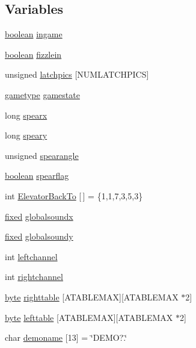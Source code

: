 \subsection*{Variables}
\begin{DoxyCompactItemize}
\item 
\hyperlink{ID__HEAD_8H_a7c6368b321bd9acd0149b030bb8275ed}{boolean} \hyperlink{WL__GAME_8C_aa5cd2906ddbef01eb4893f711504c438}{ingame}
\item 
\hyperlink{ID__HEAD_8H_a7c6368b321bd9acd0149b030bb8275ed}{boolean} \hyperlink{WL__GAME_8C_acfcefdf2f47adc93363a7557a347accd}{fizzlein}
\item 
unsigned \hyperlink{WL__GAME_8C_adbe64e9f4cdaee2e69ce2b915bd5c9ff}{latchpics} \mbox{[}NUMLATCHPICS\mbox{]}
\item 
\hyperlink{structgametype}{gametype} \hyperlink{WL__GAME_8C_a3aae581094bd3233febed90eb582c70d}{gamestate}
\item 
long \hyperlink{WL__GAME_8C_a1ef14592c8e9de332d645be5e3374f4a}{spearx}
\item 
long \hyperlink{WL__GAME_8C_a01339fc6073a44a9034c4be0521b04f8}{speary}
\item 
unsigned \hyperlink{WL__GAME_8C_aeabd6653f233001b4ab39e050f68e50a}{spearangle}
\item 
\hyperlink{ID__HEAD_8H_a7c6368b321bd9acd0149b030bb8275ed}{boolean} \hyperlink{WL__GAME_8C_acb0002722dd184f6c0ed9e21d9d4f4f2}{spearflag}
\item 
int \hyperlink{WL__GAME_8C_a9c3f6257e040f08360ea804736ff8565}{ElevatorBackTo} \mbox{[}$\,$\mbox{]} = \{1,1,7,3,5,3\}
\item 
\hyperlink{WL__DEF_8H_aaf54715c9b83afe8794059fcf5fd5e7e}{fixed} \hyperlink{WL__GAME_8C_aa6ef54cae097d6dcf5978bfb47878b38}{globalsoundx}
\item 
\hyperlink{WL__DEF_8H_aaf54715c9b83afe8794059fcf5fd5e7e}{fixed} \hyperlink{WL__GAME_8C_a6449802efb1ebe896474ec55a38dbdd2}{globalsoundy}
\item 
int \hyperlink{WL__GAME_8C_ab6aa6dd4038aac44d98f4a49f4eac7e6}{leftchannel}
\item 
int \hyperlink{WL__GAME_8C_acaafea4509823e29f2db52d7572f650c}{rightchannel}
\item 
\hyperlink{ID__HEAD_8H_a0c8186d9b9b7880309c27230bbb5e69d}{byte} \hyperlink{WL__GAME_8C_af8f5331c080873bf88230ea5dea0075f}{righttable} \mbox{[}ATABLEMAX\mbox{]}\mbox{[}ATABLEMAX $\ast$2\mbox{]}
\item 
\hyperlink{ID__HEAD_8H_a0c8186d9b9b7880309c27230bbb5e69d}{byte} \hyperlink{WL__GAME_8C_a784485413ec292eed3fe8f5f5d48a479}{lefttable} \mbox{[}ATABLEMAX\mbox{]}\mbox{[}ATABLEMAX $\ast$2\mbox{]}
\item 
char \hyperlink{WL__GAME_8C_acb52b6551afe5f2e9728a26e53761134}{demoname} \mbox{[}13\mbox{]} = \char`\"{}DEMO?.\char`\"{}
\end{DoxyCompactItemize}


